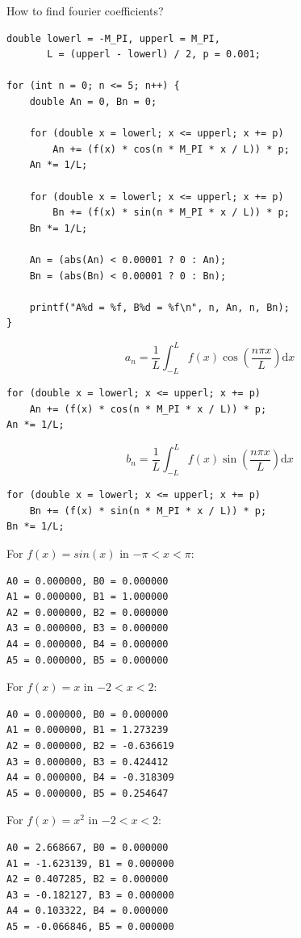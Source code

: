 \documentclass[xcolor={rgb}]{beamer}
\begin{document}
	\begin{frame}[fragile,c]{How to find fourier coefficients?}
		\footnotesize
		\begin{overprint}
			\begin{verbatim}
double lowerl = -M_PI, upperl = M_PI,
       L = (upperl - lowerl) / 2, p = 0.001;

for (int n = 0; n <= 5; n++) {
	double An = 0, Bn = 0;

	for (double x = lowerl; x <= upperl; x += p)
		An += (f(x) * cos(n * M_PI * x / L)) * p;
	An *= 1/L;

	for (double x = lowerl; x <= upperl; x += p)
		Bn += (f(x) * sin(n * M_PI * x / L)) * p;
	Bn *= 1/L;

	An = (abs(An) < 0.00001 ? 0 : An);
	Bn = (abs(Bn) < 0.00001 ? 0 : Bn);

	printf("A%d = %f, B%d = %f\n", n, An, n, Bn);
}
			\end{verbatim}

			\[ a_n = \frac1L \int_{-L}^{L} f(x)\cos(\frac{n \pi x}{L})\mathrm{d}x \]

			\begin{verbatim}
for (double x = lowerl; x <= upperl; x += p)
	An += (f(x) * cos(n * M_PI * x / L)) * p;
An *= 1/L;
			\end{verbatim}

			\[ b_n = \frac1L \int_{-L}^{L} f(x)\sin(\frac{n \pi x}{L})\mathrm{d}x \]

			\begin{verbatim}
for (double x = lowerl; x <= upperl; x += p)
	Bn += (f(x) * sin(n * M_PI * x / L)) * p;
Bn *= 1/L;
			\end{verbatim}


			\vspace*{1cm}
			For $f(x) = sin(x)$ in $-\pi < x < \pi$:

			\begin{verbatim}
A0 = 0.000000, B0 = 0.000000
A1 = 0.000000, B1 = 1.000000
A2 = 0.000000, B2 = 0.000000
A3 = 0.000000, B3 = 0.000000
A4 = 0.000000, B4 = 0.000000
A5 = 0.000000, B5 = 0.000000
			\end{verbatim}

			\vspace*{1cm}
			For $f(x) = x$ in $-2 < x < 2$:

			\begin{verbatim}
A0 = 0.000000, B0 = 0.000000
A1 = 0.000000, B1 = 1.273239
A2 = 0.000000, B2 = -0.636619
A3 = 0.000000, B3 = 0.424412
A4 = 0.000000, B4 = -0.318309
A5 = 0.000000, B5 = 0.254647
			\end{verbatim}

			\vspace*{1cm}
			For $f(x) = x^2$ in $-2 < x < 2$:

			\begin{verbatim}
A0 = 2.668667, B0 = 0.000000
A1 = -1.623139, B1 = 0.000000
A2 = 0.407285, B2 = 0.000000
A3 = -0.182127, B3 = 0.000000
A4 = 0.103322, B4 = 0.000000
A5 = -0.066846, B5 = 0.000000
 			\end{verbatim}
			\end{overprint}
	\end{frame}
\end{document}
